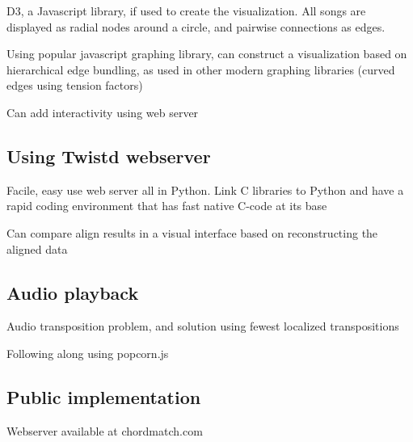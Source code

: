 D3, a Javascript library, if used to create the visualization. All songs are displayed as radial nodes around a circle, and pairwise connections as edges.

\item Using popular javascript graphing library, can construct a visualization based on hierarchical edge bundling, as used in other modern graphing libraries (curved edges using tension factors)

\item Can add interactivity using web server

\subsection{Using Twistd webserver}

\item Facile, easy use web server all in Python. Link C libraries to Python and have a rapid coding environment that has fast native C-code at its base

\item Can compare align results in a visual interface based on reconstructing the aligned data

\subsection{Audio playback}

\item Audio transposition problem, and solution using fewest localized transpositions

\item Following along using popcorn.js

\subsection{Public implementation}

\item Webserver available at chordmatch.com